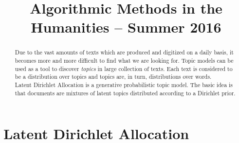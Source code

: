 \documentclass[a4paper,ngerman]{atseminar}
\title{Algorithmic Methods in the Humanities – Summer 2016}
\author{}
\begin{document}
\maketitle

\ENGLISH

\section{Latent Dirichlet Allocation}

\begin{abstract}
Due to the vast amounts of texts which are produced and digitized on a daily basis, it 
becomes more and more difficult to find what we are looking for. Topic models can 
be used as a tool to discover \textit{topics} in large collection of texts. Each text 
is considered to be a distribution over topics and topics are, in turn, distributions over
words. \\
Latent Dirichlet Allocation is a generative probabilistic topic model. The basic idea is
that documents are mixtures of latent topics distributed according to a Dirichlet prior.


\end{abstract}
\end{document}
